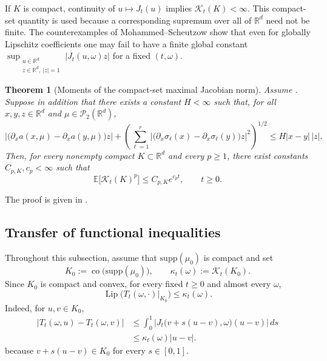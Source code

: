 \documentclass{tsp-short}
\newtheorem{theorem}{Theorem}[section]
\theoremstyle{remark}
\theoremstyle{definition}
\newcommand{\R}{\mathbb{R}} %
\newcommand{\cP}{\mathcal{P}} %
\newcommand{\E}{\mathbb E} %
\newcommand{\supp}{\mathrm{supp}} %
\DeclareMathOperator{\Lip}{Lip} %
\begin{document}
If \(K\) is compact, continuity of \(u\mapsto J_t(u)\) implies \(\mathcal K_t(K)<\infty\).
This compact-set quantity is used because a corresponding supremum over all of \(\R^d\) need not be finite.
The counterexamples of Mohammed--Scheutzow \cite{mohammed_scheutzow1998} show that even for globally Lipschitz coefficients one may fail
to have a finite global constant
\( \sup_{\substack{u\in\R^d\\ z\in\R^d,\ |z|=1}} |J_t(u,\omega)z| \) for a fixed \((t,\omega)\).

\begin{theorem}[Moments of the compact-set maximal Jacobian norm]\label{thm:kt-moment}
	Assume . Suppose in addition that there exists a constant
	\(H<\infty\) such that, for all \(x,y,z\in\R^d\) and \(\mu\in\cP_2(\R^d)\),
	\begin{equation}\label{eq:spatial-lipschitz-derivatives}
		\big| \big(\partial_x a(x,\mu)-\partial_x a(y,\mu)\big)z \big| + \left( \sum_{\ell=1}^{r}
		\big| \big(\partial_x\sigma_\ell(x)-\partial_x\sigma_\ell(y)\big)z \big|^2 \right)^{1/2}
		\le H|x-y|\,|z|.
	\end{equation}
	Then, for every nonempty compact \(K\subset\R^d\) and every
	\(p\ge1\), there exist constants \(C_{p,K},c_p<\infty\) such that
	\begin{equation}\label{eq:kt-exp-growth}
		\E\big[\mathcal K_t(K)^p\big] \le C_{p,K}e^{c_pt}, \qquad t\ge0.
	\end{equation}
\end{theorem}

The proof is given in .

\subsection{Transfer of functional inequalities}\label{subsec:functional-inequality-transfer}

Throughout this subsection, assume that \(\supp(\mu_0)\) is compact and set
\begin{equation*}
	K_0:=\operatorname{co}\bigl(\supp(\mu_0)\bigr), \qquad \kappa_t(\omega):=\mathcal K_t(K_0).
\end{equation*}
Since \(K_0\) is compact and convex, for every fixed \(t\ge0\) and almost every \(\omega\),
\begin{equation}\label{eq:flow-lipschitz-kappa}
	\Lip\bigl(T_t(\omega,\cdot)|_{K_0}\bigr) \le \kappa_t(\omega).
\end{equation}
Indeed, for \(u,v\in K_0\),
\begin{align*}
	|T_t(\omega,u)-T_t(\omega,v)| & \le \int_0^1\left| J_t\bigl(v+s(u-v),\omega\bigr)(u-v) \right|\,ds \\
	                              & \le \kappa_t(\omega)|u-v|.
\end{align*}
because \(v+s(u-v)\in K_0\) for every \(s\in[0,1]\).
\end{document}
